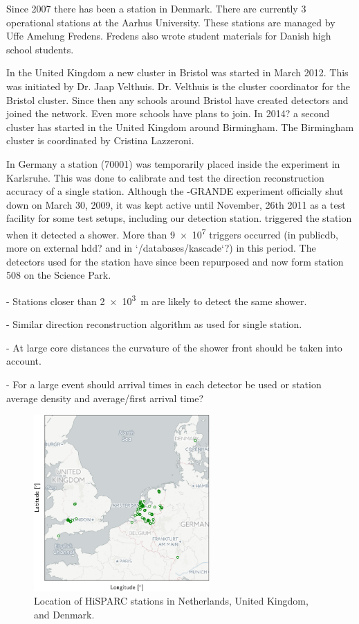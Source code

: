 Since 2007 there has been a \hisparc station in Denmark. There are currently 3 operational stations at the Aarhus University. These stations are managed by Uffe Amelung Fredens. Fredens also wrote student materials for Danish high school students.

In the United Kingdom a new cluster in Bristol was started in March 2012. This was initiated by Dr. Jaap Velthuis. Dr. Velthuis is the cluster coordinator for the Bristol cluster. Since then any schools around Bristol have created detectors and joined the network. Even more schools have plans to join. In 2014? a second cluster has started in the United Kingdom around Birmingham. The Birmingham cluster is coordinated by Cristina Lazzeroni.

In Germany a station (70001) was temporarily placed inside the \kascade experiment in Karlsruhe. This was done to calibrate and test the direction reconstruction accuracy of a single \hisparc station. Although the \kascade-GRANDE experiment officially shut down on March 30, 2009, it was kept active until November, 26th 2011 as a test facility for some test setups, including our detection station. \kascade triggered the \hisparc station when it detected a shower. More than \num{9e7} triggers occurred (in publicdb, more on external hdd? and in `/databases/kascade`?) in this period. The detectors used for the \kascade station have since been repurposed and now form station 508 on the Science Park.

- Stations closer than \SI{2e3}{\meter} are likely to detect the same shower.

- Similar direction reconstruction algorithm as used for single station.

- At large core distances the curvature of the shower front should be taken into account.

- For a large event should arrival times in each detector be used or station average density and average/first arrival time?

\begin{figure}
    \centering
    \includegraphics[width=0.6\textwidth]
                    {plots/experiment/network}
    \caption{Location of HiSPARC stations in Netherlands, United Kingdom, and Denmark.}
    \label{fig:network}
\end{figure}


